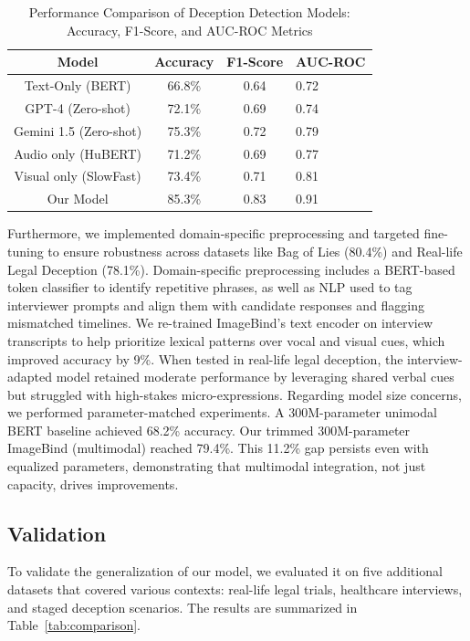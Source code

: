 \documentclass[11pt]{article}
\begin{document}
\begin{table}[htbp]
\centering
\small
\renewcommand{\arraystretch}{1.5}
\addtolength{\tabcolsep}{-2.5pt}
    \begin{tabular}{c c c p{0.7cm}} \hline 
         \textbf{Model} & \textbf{Accuracy} & \textbf{F1-Score} & \textbf{AUC-ROC} \\ \hline
         Text-Only (BERT) & 66.8\% & 0.64 & 0.72 \\
         GPT-4 (Zero-shot) & 72.1\% & 0.69 & 0.74 \\
         Gemini 1.5 (Zero-shot) & 75.3\% & 0.72 & 0.79 \\
         Audio only (HuBERT) & 71.2\% & 0.69 & 0.77 \\ 
         Visual only (SlowFast) & 73.4\% & 0.71 & 0.81 \\
         Our Model & 85.3\% & 0.83 & 0.91\\ \hline
    \end{tabular}
    \caption{Performance Comparison of Deception Detection Models: Accuracy, F1-Score, and AUC-ROC Metrics}
    \label{tab:model_comparison}

\end{table}

Furthermore, we implemented domain-specific preprocessing and targeted fine-tuning to ensure robustness across datasets like Bag of Lies (80.4\%) and Real-life Legal Deception (78.1\%). Domain-specific preprocessing includes a BERT-based token classifier to identify repetitive phrases, as well as NLP used to tag interviewer prompts and align them with candidate responses and flagging mismatched timelines. We re-trained ImageBind's text encoder on interview transcripts to help prioritize lexical patterns over vocal and visual cues, which improved accuracy by 9\%. When tested in real-life legal deception, the interview-adapted model retained moderate performance by leveraging shared verbal cues but struggled with high-stakes micro-expressions. Regarding model size concerns, we performed parameter-matched experiments. A 300M-parameter unimodal BERT baseline achieved 68.2\% accuracy. Our trimmed 300M-parameter ImageBind (multimodal) reached 79.4\%. This 11.2\% gap persists even with equalized parameters, demonstrating that multimodal integration, not just capacity, drives improvements.

\subsection{Validation}
To validate the generalization of our model, we evaluated it on five additional datasets that covered various contexts: real-life legal trials, healthcare interviews, and staged deception scenarios. The results are summarized in Table~\ref{tab:comparison}.
\end{document}
